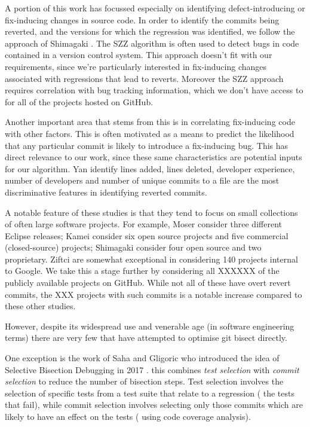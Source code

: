 \documentclass[10pt,journal,compsoc]{IEEEtran}
\begin{document}
A portion of this work has focussed especially on identifying defect-introducing or fix-inducing changes in source code. In order to identify the commits being reverted, and the versions for which the regression was identified, we follow the approach of Shimagaki \etal \cite{shimagaki2016}. The SZZ algorithm \cite{sliwerski2005} is often used to detect bugs in code contained in a version control system. This approach doesn't fit with our requirements, since we're particularly interested in fix-inducing changes associated with regressions that lead to reverts. Moreover the SZZ approach requires correlation with bug tracking information, which we don't have access to for all of the projects hosted on GitHub.

Another important area that stems from this is in correlating fix-inducing code with other factors. This is often motivated as a means to predict the likelihood that any particular commit is likely to introduce a fix-inducing bug. This has direct relevance to our work, since these same characteristics are potential inputs for our algorithm. Yan \etal \cite{yan2019} identify lines added, lines deleted, developer experience, number of developers and number of unique commits to a file are the most discriminative features in identifying reverted commits.

A notable feature of these studies is that they tend to focus on small collections of often large software projects. For example, Moser \etal \cite{moser2008} consider three different Eclipse releases; Kamei \etal \cite{kamei2013} consider six open source projects and five commercial (closed-source) projects; Shimagaki \etal \cite{shimagaki2016} consider four open source and two proprietary. Ziftci \etal \cite{ziftci2013, ziftci2017} are somewhat exceptional in considering 140 projects internal to Google. We take this a stage further by considering all XXXXXX of the publicly available projects on GitHub. While not all of these have overt revert commits, the XXX projects with such commits is a notable increase compared to these other studies.

However, despite its widespread use and venerable age (in software engineering terms) there are very few that have attempted to optimise {\code git bisect} directly.

One exception is the work of Saha and Gligoric who introduced the idea of Selective Bisection Debugging in 2017 \cite{saha2017}. this combines {\it test selection\/} with {\it commit selection\/} to reduce the number of bisection steps. Test selection involves the selection of specific tests from a test suite that relate to a regression (\ie\/ the tests that fail), while commit selection involves selecting only those commits which are likely to have an effect on the tests (\eg\/ using code coverage analysis).
\end{document}
